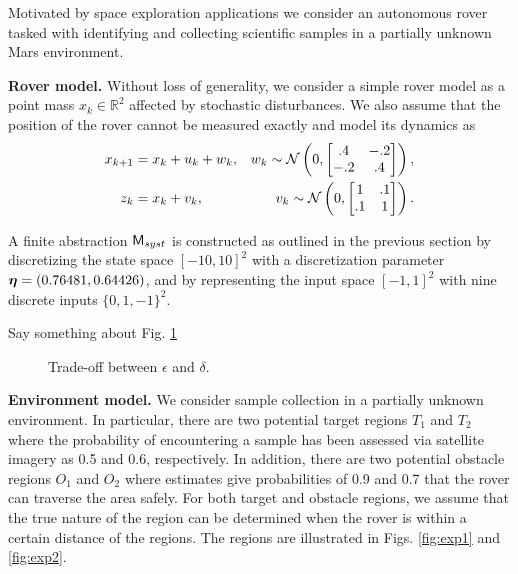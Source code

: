 \documentclass{ifacconf}
\begin{document}
Motivated by space exploration applications we consider an autonomous rover tasked with identifying and collecting scientific samples in a partially unknown Mars environment.

\textbf{Rover model.} Without loss of generality, we consider a simple rover model as a point mass $x_k \in \mathbb{R}^2$ affected by stochastic disturbances. We also assume that the position of the rover cannot be measured exactly and model its dynamics as
\begin{equation*}
\begin{aligned}
  x_{k+1}&= x_{k} + u_k+ w_k,  & w_k \sim \mathcal{N} \left(0,\begin{bmatrix}.4&-.2\\-.2&.4\end{bmatrix}\right), \\
  z_k&= x_k+v_k, &  v_k \sim \mathcal{N} \left(0,\begin{bmatrix}1&.1\\.1&1\end{bmatrix}\right).
\end{aligned}
\end{equation*}

A finite abstraction $\mathsf{M}_{syst}$ is constructed as outlined in the previous section by discretizing the state space $[-10, 10]^2$ with a discretization parameter ${\boldsymbol{\eta}} = (0.76481, 0.64426)$, and by representing the input space $[-1,1]^2$ with nine discrete inputs $\{0, 1, -1\}^2$.

{\color{red} 
Say something about Fig. \ref{fig:tradeoff}}

\begin{figure}
  
  \caption{Trade-off between $\epsilon$ and $\delta$.  }
  \label{fig:tradeoff}
\end{figure}

\textbf{Environment model.} We consider sample collection in a partially unknown environment. In particular, there are two potential target regions $T_1$ and $T_2$ where the probability of encountering a sample has been assessed via satellite imagery as 0.5 and 0.6, respectively. In addition, there are two potential obstacle regions $O_1$ and $O_2$ where estimates give probabilities of 0.9 and 0.7 that the rover can traverse the area safely. For both target and obstacle regions, we assume that the true nature of the region can be determined when the rover is within a certain distance of the regions. The regions are illustrated in Figs. \ref{fig:exp1} and \ref{fig:exp2}.
\end{document}
